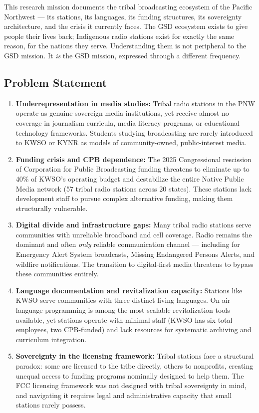 \documentclass[11pt,letterpaper]{article}
\begin{document}
This research mission documents the tribal broadcasting ecosystem of the Pacific Northwest --- its stations, its languages, its funding structures, its sovereignty architecture, and the crisis it currently faces. The GSD ecosystem exists to give people their lives back; Indigenous radio stations exist for exactly the same reason, for the nations they serve. Understanding them is not peripheral to the GSD mission. It \textit{is} the GSD mission, expressed through a different frequency.

\subsection{Problem Statement}

\begin{enumerate}
  \item \textbf{Underrepresentation in media studies:} Tribal radio stations in the PNW operate as genuine sovereign media institutions, yet receive almost no coverage in journalism curricula, media literacy programs, or educational technology frameworks. Students studying broadcasting are rarely introduced to KWSO or KYNR as models of community-owned, public-interest media.
  \item \textbf{Funding crisis and CPB dependence:} The 2025 Congressional rescission of Corporation for Public Broadcasting funding threatens to eliminate up to 40\% of KWSO's operating budget and destabilize the entire Native Public Media network (57 tribal radio stations across 20 states). These stations lack development staff to pursue complex alternative funding, making them structurally vulnerable.
  \item \textbf{Digital divide and infrastructure gaps:} Many tribal radio stations serve communities with unreliable broadband and cell coverage. Radio remains the dominant and often \textit{only} reliable communication channel — including for Emergency Alert System broadcasts, Missing Endangered Persons Alerts, and wildfire notifications. The transition to digital-first media threatens to bypass these communities entirely.
  \item \textbf{Language documentation and revitalization capacity:} Stations like KWSO serve communities with three distinct living languages. On-air language programming is among the most scalable revitalization tools available, yet stations operate with minimal staff (KWSO has six total employees, two CPB-funded) and lack resources for systematic archiving and curriculum integration.
  \item \textbf{Sovereignty in the licensing framework:} Tribal stations face a structural paradox: some are licensed to the tribe directly, others to nonprofits, creating unequal access to funding programs nominally designed to help them. The FCC licensing framework was not designed with tribal sovereignty in mind, and navigating it requires legal and administrative capacity that small stations rarely possess.
\end{enumerate}
\end{document}
